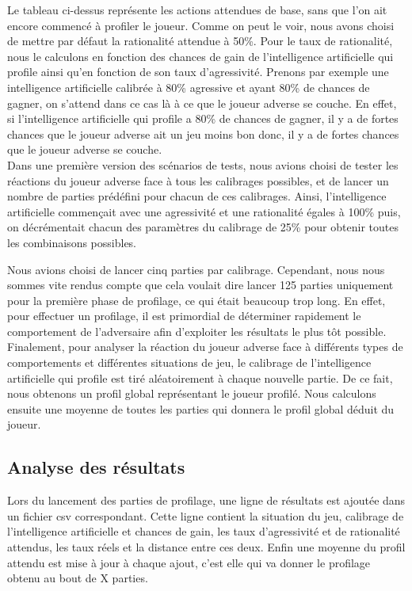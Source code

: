 \documentclass{report}
\begin{document}
Le tableau ci-dessus représente les actions attendues de base, sans que l'on ait encore commencé à profiler le joueur. Comme on peut le voir, nous avons choisi de mettre par défaut la rationalité attendue à 50\%. Pour le taux de rationalité, nous le calculons en fonction des chances de gain de l'intelligence artificielle qui profile ainsi qu'en fonction de son taux d'agressivité. Prenons par exemple une intelligence artificielle calibrée à 80\% agressive et ayant 80\% de chances de gagner, on s'attend dans ce cas là à ce que le joueur adverse se couche. En effet, si l'intelligence artificielle qui profile a 80\% de chances de gagner, il y a de fortes chances que le joueur adverse ait un jeu moins bon donc, il y a de fortes chances que le joueur adverse se couche.\\

Dans une première version des scénarios de tests, nous avions choisi de tester les réactions du joueur adverse face à tous les calibrages possibles, et de lancer un nombre de parties prédéfini pour chacun de ces calibrages. Ainsi, l'intelligence artificielle commençait avec une agressivité et une rationalité égales à 100\% puis, on décrémentait chacun des paramètres du calibrage de 25\% pour obtenir toutes les combinaisons possibles.\par
Nous avions choisi de lancer cinq parties par calibrage. Cependant, nous nous sommes vite rendus compte que cela voulait dire lancer 125 parties uniquement pour la première phase de profilage, ce qui était beaucoup trop long. En effet, pour effectuer un profilage, il est primordial de déterminer rapidement le comportement de l'adversaire afin d'exploiter les résultats le plus tôt possible.\\

Finalement, pour analyser la réaction du joueur adverse face à différents types de comportements et différentes situations de jeu, le calibrage de l'intelligence artificielle qui profile est tiré aléatoirement à chaque nouvelle partie. De ce fait, nous obtenons un profil global représentant le joueur profilé. Nous calculons ensuite une moyenne de toutes les parties qui donnera le profil global déduit du joueur.

\subsection{Analyse des résultats}

\hspace{0.5cm}Lors du lancement des parties de profilage, une ligne de résultats est ajoutée dans un fichier csv correspondant. Cette ligne contient la situation du jeu, calibrage de l'intelligence artificielle et chances de gain, les taux d'agressivité et de rationalité attendus, les taux réels et la distance entre ces deux. Enfin une moyenne du profil attendu est mise à jour à chaque ajout, c'est elle qui va donner le profilage obtenu au bout de X parties.\\
\end{document}
